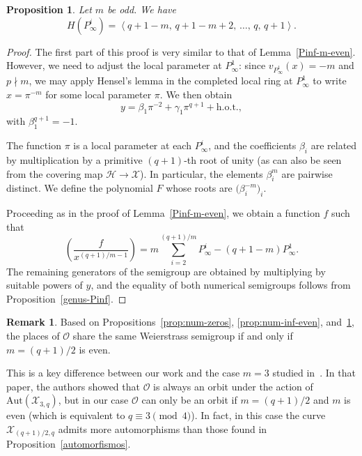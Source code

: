 \documentclass[12pt]{amsart}
\newtheorem{proposition}[theorem]{Proposition}
\theoremstyle{remark}
\theoremstyle{definition}
\newtheorem{remark}[theorem]{Remark}
\begin{document}
\begin{proposition}\label{prop:num-inf-odd}
    Let $m$ be odd. We have
    $$H(P_{\infty}^i) =
      \left\langle q+1-m,\, q+1-m+2,\, \ldots,\, q,\, q+1 \right\rangle.$$
\end{proposition}

\begin{proof}
    The first part of this proof is very similar to that of
    Lemma~\ref{Pinf-m-even}. However, we need to adjust the local parameter at
    $P_{\infty}^1$: since $v_{P_{\infty}^1}(x) = -m$ and $p \nmid m$, we may
    apply Hensel's lemma in the completed local ring at $P_{\infty}^1$ to write
    $x = \pi^{-m}$ for some local parameter $\pi$. We then obtain
    $$y = \beta_1\pi^{-2} + \gamma_1\pi^{q+1} + \textrm{h.o.t.},$$
    with $\beta_1^{q+1} = -1$.

    The function $\pi$ is a local parameter at each $P_{\infty}^i$, and the
    coefficients $\beta_i$ are related by multiplication by a primitive
    $(q+1)$-th root of unity (as can also be seen from the covering map
    $\mathcal{H} \rightarrow \mathcal{X}$). In particular, the elements
    $\beta_i^m$ are pairwise distinct. We define the polynomial $F$ whose roots
    are $\bigl(\beta_i^{-m}\bigr)_i$.

    Proceeding as in the proof of Lemma~\ref{Pinf-m-even}, we obtain a function
    $f$ such that
    $$\left(\frac{f}{x^{(q+1)/m-1}}\right)
      = m \sum_{i=2}^{(q+1)/m} P_{\infty}^i - (q+1-m)P_{\infty}^1.$$
    The remaining generators of the semigroup are obtained by multiplying by
    suitable powers of $y$, and the equality of both numerical semigroups
    follows from Proposition~\ref{genus-Pinf}.
\end{proof}

\begin{remark}
    \rm{Based on Propositions~\ref{prop:num-zeros}, \ref{prop:num-inf-even},
    and~\ref{prop:num-inf-odd}, the places of $\mathcal{O}$ share the same
    Weierstrass semigroup if and only if $m = (q+1)/2$ is even.}
\end{remark}

This is a key difference between our work and the case $m = 3$ studied
in~\cite{BMV}. In that paper, the authors showed that $\mathcal{O}$ is always
an orbit under the action of $\textrm{Aut}(\mathcal{X}_{3,q})$, but in our
case $\mathcal{O}$ can only be an orbit if $m = (q+1)/2$ and $m$ is even (which
is equivalent to $q \equiv 3 \pmod{4}$). In fact, in this case the curve
$\mathcal{X}_{(q+1)/2,q}$ admits more automorphisms than those found in
Proposition~\ref{automorfismos}.
\end{document}
